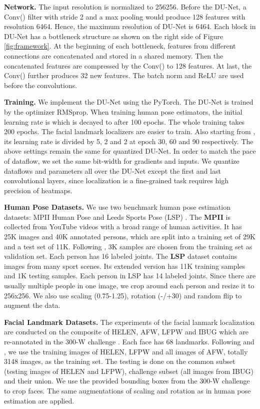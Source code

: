 \documentclass[runningheads]{llncs}
\begin{document}
{\bf Network.} The input resolution is normalized to 256256. Before the DU-Net, a Conv() filter with stride 2 and a max pooling would produce 128 features with resolution 6464. Hence, the maximum resolution of DU-Net is 6464. Each block in DU-Net has a bottleneck structure as shown on the right side of Figure \ref{fig:framework}. At the beginning of each bottleneck, features from different connections are concatenated and stored in a shared memory. Then the concatenated features are compressed by the Conv() to 128 features. At last, the Conv() further produces 32 new features. The batch norm and ReLU are used before the convolutions. 

{\bf Training.} We implement the DU-Net using the PyTorch. The DU-Net is trained by the optimizer RMSprop. When training human pose estimators, the initial learning rate is  which is decayed to  after 100 epochs. The whole training takes 200 epochs. The facial landmark localizers are easier to train. Also starting from , its learning rate is divided by 5, 2 and 2 at epoch 30, 60 and 90 respectively. The above settings remain the same for quantized
DU-Net. In order to match the pace of dataflow, we set the same bit-width for gradients and inputs. We quantize dataflows and parameters all over the DU-Net except the first and last convolutional layers, since localization is a fine-grained task requires high precision of heatmaps.

{\bf Human Pose Datasets.} We use two benchmark human pose estimation datasets: MPII Human Pose \cite{andriluka14cvpr} and Leeds Sports Pose (LSP) \cite{johnson2010lsp}. The {\bf MPII} is collected from YouTube videos with a broad range of human activities. It has 25K images and 40K annotated persons, which are split into a training set of 29K and a test set of 11K. Following \cite{tompson2015efficient}, 3K samples are chosen from the training set as validation set. Each person has 16 labeled joints. The {\bf LSP} dataset contains images from many sport scenes. Its extended version has 11K training samples and 1K testing samples. Each person in LSP has 14 labeled joints. Since there are usually multiple people in one image, we crop around each person and resize it to 256x256. We also use scaling (0.75-1.25), rotation (-/+30) and random flip to augment the data.

{\bf Facial Landmark Datasets.} The experiments of the facial lanmark localization are conducted on the composite of HELEN, AFW, LFPW and IBUG which are re-annotated in the 300-W challenge \cite{sagonas2013300}. Each face has 68 landmarks. Following \cite{zhu2015face} and \cite{lv2017deep}, we use the training images of HELEN, LFPW and all images of AFW, totally 3148 images, as the training set. The testing is done on the common subset (testing images of HELEN and LFPW), challenge subset (all images from IBUG) and their union. We use the provided bounding boxes from the 300-W challenge to crop faces. The same augmentations of scaling and rotation as in human pose estimation are applied.
\end{document}
